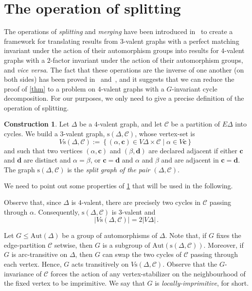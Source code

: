 \documentclass[a4paper]{amsart}
\newcommand{\Aut}{\mathrm{Aut}}
\newcommand{\0}{\mathbf{0}}
\theoremstyle{definition}
\newtheorem{construction}[thm]{Construction}
\begin{document}
\section{The operation of splitting}\label{sec:split}
    The operations of \emph{splitting} and \emph{merging} have been introduced in~\cite[Constructions~7 and~11]{PotocnikSpigaVerret2013} to create a framework for translating results from $3$-valent graphs with a perfect matching invariant under the action of their automorphism groups into results for $4$-valent graphs with a $2$-factor invariant under the action of their automorphism groups, and \textit{vice versa}. The fact that these operations are the inverse of one another (on both sides) has been proved in~\cite[Theorem~12]{PotocnikSpigaVerret2013} and~\cite[Theorem~2.9]{BarbieriGrazianSpiga2025}, and it suggests that we can reduce the proof of \cref{thm} to a problem on $4$-valent graphs with a $G$-invariant cycle decomposition. For our purposes, we only need to give a precise definition of the operation of splitting.

    \begin{construction}\label{con:splitting}
        Let $\Delta$ be a $4$-valent graph, and let $\mathcal{C}$ be a partition of $E\Delta$ into cycles. We build a $3$-valent graph, $\mathrm{s}(\Delta,\mathcal{C})$, whose vertex-set is
        \[ V\mathrm{s}(\Delta,\mathcal{C}) := \left\{(\alpha,\mathbf{c}) \in V\Delta \times \mathcal{C} \mid \alpha \in V\mathbf{c} \right\} \,\]
        and such that two vertices $(\alpha,\mathbf{c})$ and $(\beta,\mathbf{d})$ are declared adjacent if either $\mathbf{c}$ and $\mathbf{d}$ are distinct and $\alpha= \beta$, or $\mathbf{c}=\mathbf{d}$ and $\alpha$ and $\beta$ and are adjacent in $\mathbf{c}=\mathbf{d}$. The graph $\mathrm{s}(\Delta,\mathcal{C})$ is the \emph{split graph of the pair $(\Delta,\mathcal{C})$}.
    \end{construction}

    We need to point out some properties of \cref{con:splitting} that will be used in the following.
    
    Observe that, since $\Delta$ is $4$-valent, there are precisely two cycles in $\mathcal{C}$ passing through $\alpha$. Consequently, $\mathrm{s}(\Delta,\mathcal{C})$ is $3$-valent and
    \[ |V\mathrm{s}(\Delta,\mathcal{C})| = 2 |V\Delta| \,.\]
    
    Let $G\le \Aut(\Delta)$ be a group of automorphisms of $\Delta$. Note that, if $G$ fixes the edge-partition $\mathcal{C}$ setwise, then $G$ is a subgroup of $\Aut(\mathrm{s}(\Delta,\mathcal{C}))$. Moreover, if $G$ is arc-transitive on $\Delta$, then $G$ can swap the two cycles of $\mathcal{C}$ passing through each vertex. Hence, $G$ acts transitively on $V\mathrm{s}(\Delta,\mathcal{C})$. Observe that the $G$-invariance of $\mathcal{C}$ forces the action of any vertex-stabilizer on the neighbourhood of the fixed vertex to be imprimitive. We say that $G$ is \emph{locally-imprimitive}, for short.
    
\end{document}
